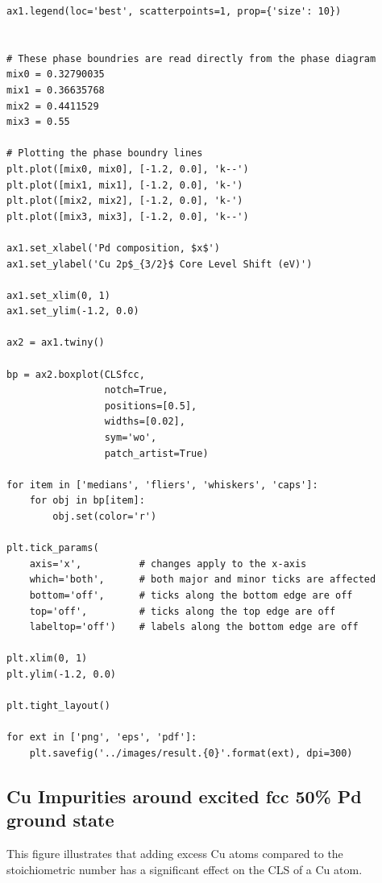 \documentclass[number, sort&compress, review, 12pt]{elsarticle}
\begin{document}
\begin{verbatim}
ax1.legend(loc='best', scatterpoints=1, prop={'size': 10})


# These phase boundries are read directly from the phase diagram
mix0 = 0.32790035
mix1 = 0.36635768
mix2 = 0.4411529
mix3 = 0.55

# Plotting the phase boundry lines
plt.plot([mix0, mix0], [-1.2, 0.0], 'k--')
plt.plot([mix1, mix1], [-1.2, 0.0], 'k-')
plt.plot([mix2, mix2], [-1.2, 0.0], 'k-')
plt.plot([mix3, mix3], [-1.2, 0.0], 'k--')

ax1.set_xlabel('Pd composition, $x$')
ax1.set_ylabel('Cu 2p$_{3/2}$ Core Level Shift (eV)')

ax1.set_xlim(0, 1)
ax1.set_ylim(-1.2, 0.0)

ax2 = ax1.twiny()

bp = ax2.boxplot(CLSfcc,
                 notch=True,
                 positions=[0.5],
                 widths=[0.02],
                 sym='wo',
                 patch_artist=True)

for item in ['medians', 'fliers', 'whiskers', 'caps']:
    for obj in bp[item]:
        obj.set(color='r')

plt.tick_params(
    axis='x',          # changes apply to the x-axis
    which='both',      # both major and minor ticks are affected
    bottom='off',      # ticks along the bottom edge are off
    top='off',         # ticks along the top edge are off
    labeltop='off')    # labels along the bottom edge are off

plt.xlim(0, 1)
plt.ylim(-1.2, 0.0)

plt.tight_layout()

for ext in ['png', 'eps', 'pdf']:
    plt.savefig('../images/result.{0}'.format(ext), dpi=300)
\end{verbatim}

\subsection{Cu Impurities around excited fcc 50\% Pd ground state}
\label{sec-10-5}
This figure illustrates that adding excess Cu atoms compared to the stoichiometric number has a significant effect on the CLS of a Cu atom.
\end{document}
